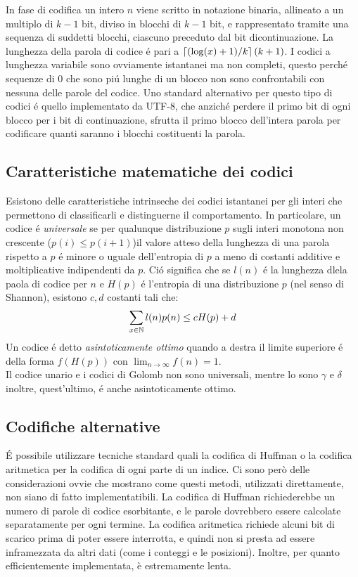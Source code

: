 In fase di codifica un intero $n$ viene scritto in notazione binaria, allineato a un multiplo di $k - 1$ bit, diviso in blocchi di $k - 1$ bit, e rappresentato tramite una sequenza di suddetti blocchi, ciascuno preceduto dal bit dicontinuazione. La lunghezza della parola di codice é pari a $\left\lceil (\log(x) + 1) / k \right\rceil(k + 1)$. I codici a lunghezza variabile sono ovviamente istantanei ma non completi, questo perché sequenze di 0 che sono piú lunghe di un blocco non sono confrontabili con nessuna delle parole del codice. Uno standard alternativo per questo tipo di codici é quello implementato da UTF-8, che anziché perdere il primo bit di ogni blocco per i bit di continuazione, sfrutta il primo blocco dell'intera parola per codificare quanti saranno i blocchi costituenti la parola.


\subsection{Caratteristiche matematiche dei codici}
Esistono delle caratteristiche intrinseche dei codici istantanei per gli interi che permettono di classificarli e distinguerne il comportamento. In particolare, un codice é \textit{universale} se per qualunque distribuzione $p$ sugli interi monotona non crescente ($p(i) \leq p(i + 1)$)il valore atteso della lunghezza di una parola rispetto a $p$ é minore o uguale dell'entropia di $p$ a meno di costanti additive e moltiplicative indipendenti da $p$. Ció significa che se $l(n)$ é la lunghezza dlela paola di codice per $n$ e $H(p)$ é l'entropia di una distribuzione $p$ (nel senso di Shannon), esistono $c, d$ costanti tali che:
\begin{equation*}
    \sum_{x \in \mathbb{N}}{l(n)p(n)} \leq cH(p) + d
\end{equation*}
Un codice é detto \textit{asintoticamente ottimo} quando a destra il limite superiore é della forma $f(H(p))$ con $\lim_{n \to \infty} f(n) = 1$.\\
Il codice unario e i codici di Golomb non sono universali, mentre lo sono $\gamma$ e $\delta$ inoltre, quest'ultimo, é anche asintoticamente ottimo.
\subsection{Codifiche alternative}
É possibile utilizzare tecniche standard quali la codifica di Huffman o la codifica aritmetica per la codifica di ogni parte di un indice. Ci sono però delle considerazioni ovvie che mostrano come questi metodi, utilizzati direttamente, non siano di fatto implementatibili. La codifica di Huffman richiederebbe un numero di parole di codice esorbitante, e le parole dovrebbero essere calcolate separatamente per ogni termine. La codifica aritmetica richiede alcuni bit di scarico prima di poter essere interrotta, e quindi non si presta ad essere inframezzata da altri dati (come i conteggi e le posizioni). Inoltre, per quanto efficientemente implementata, è estremamente lenta.
